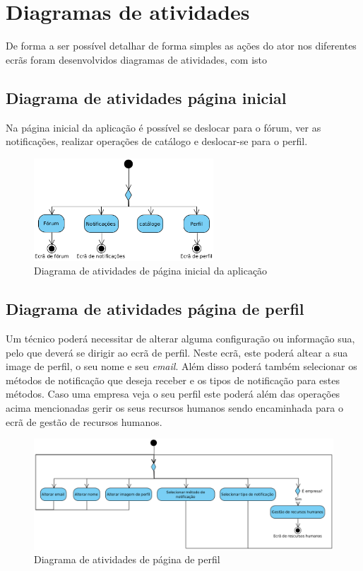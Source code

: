 \section{Diagramas de atividades}
De forma a ser possível detalhar de forma simples as ações do ator nos diferentes ecrãs foram 
desenvolvidos diagramas de atividades, com isto 

\subsection{Diagrama de atividades página inicial}

Na página inicial da aplicação é possível se deslocar para o fórum, ver as notificações, realizar operações
de catálogo e deslocar-se para o perfil.

\begin{figure}[htb]
    \centering
    \includegraphics[width=0.6\textwidth]{images/diagramas/atividades/diagrama_atividades_home.png}
    \caption{Diagrama de atividades de página inicial da aplicação}
    \label{fig:34}
\end{figure}

\subsection{Diagrama de atividades página de perfil}

Um técnico poderá necessitar de alterar alguma configuração ou informação sua, pelo que deverá se dirigir
ao ecrã de perfil. Neste ecrã, este poderá altear a sua image de perfil, o seu nome e seu \textit{email}. 
Além disso poderá também selecionar os métodos de notificação que deseja receber e os tipos de notificação
para estes métodos. Caso uma empresa veja o seu perfil este poderá além das operações acima mencionadas
gerir os seus recursos humanos sendo encaminhada para o ecrã de gestão de recursos humanos.

\begin{figure}[htb]
    \centering
    \includegraphics[width=\textwidth]{images/diagramas/atividades/diagrama_atividades_perfil.png}
    \caption{Diagrama de atividades de página de perfil}
    \label{fig:35}
\end{figure}

